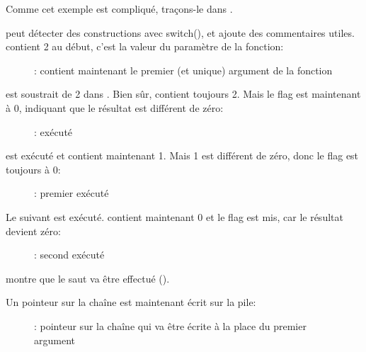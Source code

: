 ﻿\clearpage
\mysubparagraph{\olly}

Comme cet exemple est compliqué, traçons-le dans \olly.

\olly peut détecter des constructions avec switch(), et ajoute des commentaires utiles.
\EAX contient 2 au début, c'est la valeur du paramètre de la fonction:

\begin{figure}[H]
\centering
{}
\caption{\olly: \EAX 
contient maintenant le premier (et unique) argument de la fonction}
\label{fig:switch_few_olly1}
\end{figure}

 est soustrait de 2 dans \EAX.
Bien sûr, \EAX contient toujours 2.
Mais le flag \ZF est maintenant à 0, indiquant que le résultat est différent de
zéro:

\begin{figure}[H]
\centering
{}
\caption{\olly: \SUB exécuté}
\label{fig:switch_few_olly2}
\end{figure}

\clearpage
\DEC est exécuté et \EAX contient maintenant 1.
Mais 1 est différent de zéro, donc le flag \ZF est toujours à 0:

\begin{figure}[H]
\centering
{}
\caption{\olly: premier \DEC exécuté}
\label{fig:switch_few_olly3}
\end{figure}

\clearpage
Le \DEC suivant est exécuté.
\EAX contient maintenant 0 et le flag \ZF est mis, car le résultat devient zéro:

\begin{figure}[H]
\centering
{}
\caption{\olly: second \DEC exécuté}
\label{fig:switch_few_olly4}
\end{figure}

\olly montre que le saut va être effectué ().

\clearpage
Un pointeur sur la chaîne  est maintenant écrit sur la pile:

\begin{figure}[H]
\centering
{}
\caption{\olly: 
pointeur sur la chaîne qui va être écrite à la place du premier argument}
\label{fig:switch_few_olly5}
\end{figure}

